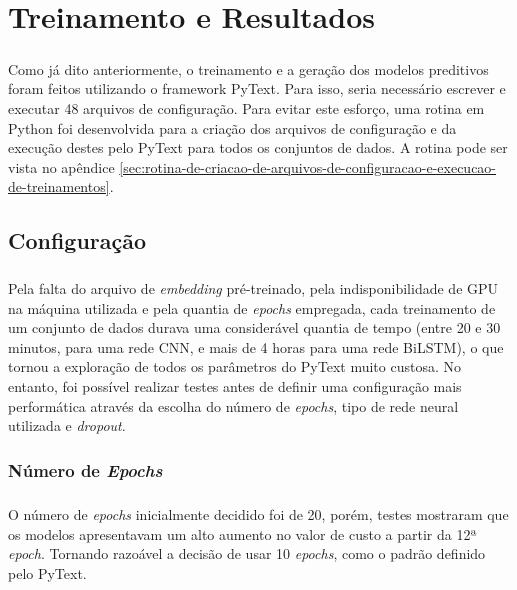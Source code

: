 \documentclass[grad,numbers]{coppe}
\begin{document}
  \chapter{Treinamento e Resultados}
	  \paragraph{}Como já dito anteriormente, o treinamento e a geração dos modelos preditivos foram feitos utilizando o framework PyText. Para isso, seria necessário escrever e executar 48 arquivos de configuração. Para evitar este esforço, uma rotina em Python foi desenvolvida para a criação dos arquivos de configuração e da execução destes pelo PyText para todos os conjuntos de dados. A rotina pode ser vista no apêndice \ref{sec:rotina-de-criacao-de-arquivos-de-configuracao-e-execucao-de-treinamentos}.
	  \section{Configuração}
		  \paragraph{}Pela falta do arquivo de \textit{embedding} pré-treinado, pela indisponibilidade de GPU na máquina utilizada e pela quantia de \textit{epochs} empregada, cada treinamento de um conjunto de dados durava uma considerável quantia de tempo (entre 20 e 30 minutos, para uma rede CNN, e mais de 4 horas para uma rede BiLSTM), o que tornou a exploração de todos os parâmetros do PyText muito custosa. No entanto, foi possível realizar testes antes de definir uma configuração mais performática através da escolha do número de \textit{epochs}, tipo de rede neural utilizada e \textit{dropout}.
		  \subsection{Número de \textit{Epochs}}
		  	\paragraph{}O número de \textit{epochs} inicialmente decidido foi de 20, porém, testes mostraram que os modelos apresentavam um alto aumento no valor de custo a partir da 12ª \textit{epoch}. Tornando razoável a decisão de usar 10 \textit{epochs}, como o padrão definido pelo PyText.
\end{document}
